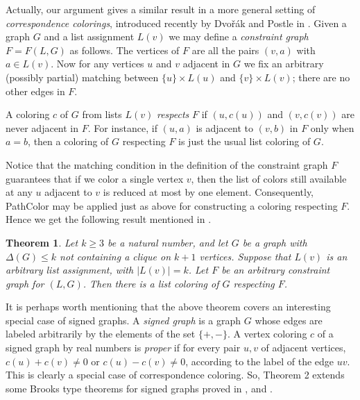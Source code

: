 \documentclass[12pt]{amsart}
\newtheorem{theorem}{Theorem}
\theoremstyle{plain}
\numberwithin{equation}{section}
\begin{document}
Actually, our argument gives a similar result in a more general setting of \emph{correspondence colorings}, introduced recently by Dvo\v{r}\'{a}k and Postle in \cite{DvorakPostle}. Given a graph $G$ and a list assignment $L(v)$ we may define a \emph{constraint graph} $F=F(L,G)$ as follows. The vertices of $F$ are all the pairs $(v,a)$ with $a\in L(v)$. 
Now for any vertices $u$ and $v$ adjacent in $G$ we fix an arbitrary (possibly partial) matching between
$\{ u \} \times L(u)$ and $\{ v \} \times L(v)$; there are no other edges in $F$. 
 
A coloring $c$ of $G$ from lists $L(v)$ \emph{respects} $F$ if $(u,c(u))$ and $(v,c(v))$ are never adjacent in $F$. 
For instance, if $(u,a)$ is adjacent to $(v,b)$ in $F$ only when $a=b$, then a coloring of $G$ respecting $F$ is just the usual list coloring of $G$.

Notice that the matching condition in the definition of the constraint graph $F$ guarantees that if we color a single vertex $v$,
then the list of colors still available at any $u$ adjacent to $v$ is reduced at most by one element. Consequently,
{\sc PathColor} may be applied just as above for constructing a coloring respecting $F$. Hence we get the 
following result mentioned in \cite{DvorakPostle}.

\begin{theorem}
Let $k\geq 3$ be a natural number, and let $G$ be a graph with $\Delta(G)\leq k$ not containing a clique on $k+1$ vertices. Suppose that $L(v)$ is an arbitrary list assignment, with $\lvert L(v)\rvert =k$. Let $F$ be an arbitrary constraint graph for $(L,G)$. Then there is a list coloring of $G$ respecting $F$.
\end{theorem}


It is perhaps worth mentioning that the above theorem covers an interesting special case of signed graphs. A \emph{signed graph} is a graph $G$ whose edges are labeled arbitrarily by the elements of the set $\{+,-\}$. A vertex coloring $c$ of a signed graph by real numbers is \emph{proper} if for every pair $u,v$ of adjacent vertices, $c(u)+c(v)\neq0$ or $c(u)-c(v)\neq0$, according to the label of the edge $uv$. This is clearly a special case of correspondence coloring. So, Theorem 2 extends some Brooks type theorems for signed graphs proved in \cite{MacajovaRS}, \cite{FleinerWiener} 
and \cite{Stiebitz}.
\end{document}
